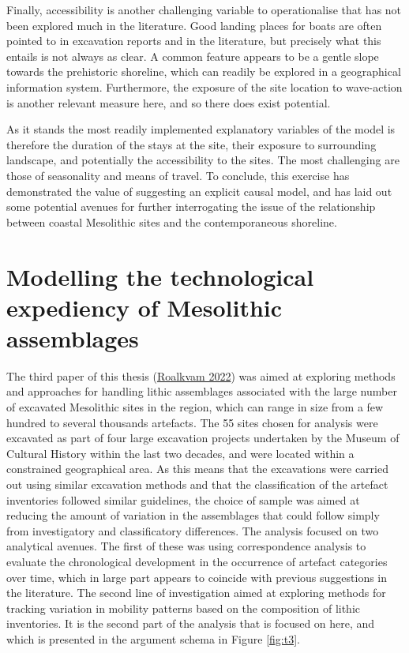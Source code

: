 \documentclass[
  12pt,
  a4paper,
  oneside]{book}
\begin{document}
Finally, accessibility is another challenging variable to operationalise that has not been explored much in the literature. Good landing places for boats are often pointed to in excavation reports and in the literature, but precisely what this entails is not always as clear. A common feature appears to be a gentle slope towards the prehistoric shoreline, which can readily be explored in a geographical information system. Furthermore, the exposure of the site location to wave-action is another relevant measure here, and so there does exist potential.

As it stands the most readily implemented explanatory variables of the model is therefore the duration of the stays at the site, their exposure to surrounding landscape, and potentially the accessibility to the sites. The most challenging are those of seasonality and means of travel. To conclude, this exercise has demonstrated the value of suggesting an explicit causal model, and has laid out some potential avenues for further interrogating the issue of the relationship between coastal Mesolithic sites and the contemporaneous shoreline.

\hypertarget{modelling-the-technological-expediency-of-mesolithic-assemblages}{%
\section{Modelling the technological expediency of Mesolithic assemblages}\label{modelling-the-technological-expediency-of-mesolithic-assemblages}}


The third paper of this thesis (\protect\hyperlink{ref-roalkvam2022}{Roalkvam 2022}) was aimed at exploring methods and approaches for handling lithic assemblages associated with the large number of excavated Mesolithic sites in the region, which can range in size from a few hundred to several thousands artefacts. The 55 sites chosen for analysis were excavated as part of four large excavation projects undertaken by the Museum of Cultural History within the last two decades, and were located within a constrained geographical area. As this means that the excavations were carried out using similar excavation methods and that the classification of the artefact inventories followed similar guidelines, the choice of sample was aimed at reducing the amount of variation in the assemblages that could follow simply from investigatory and classificatory differences. The analysis focused on two analytical avenues. The first of these was using correspondence analysis to evaluate the chronological development in the occurrence of artefact categories over time, which in large part appears to coincide with previous suggestions in the literature. The second line of investigation aimed at exploring methods for tracking variation in mobility patterns based on the composition of lithic inventories. It is the second part of the analysis that is focused on here, and which is presented in the argument schema in Figure \ref{fig:t3}.
\end{document}
